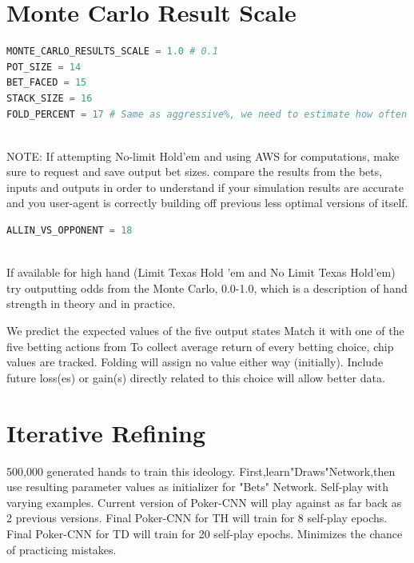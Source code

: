 \documentclass[review]{elsarticle}
\begin{document}
\section{Monte Carlo Result Scale}
\begin{lstlisting}[language=Python, caption=pokerlib.py: 222:226]
MONTE_CARLO_RESULTS_SCALE = 1.0 # 0.1
POT_SIZE = 14
BET_FACED = 15
STACK_SIZE = 16 
FOLD_PERCENT = 17 # Same as aggressive%, we need to estimate how often good training data (CFR) folds in this similar spot?
\end{lstlisting}
~\cite{moscow25} \\
NOTE: If attempting No-limit Hold'em and using AWS for computations, make sure to request and save output bet sizes.
compare the results from the bets, inputs and outputs in order to understand if your simulation results are
accurate and you user-agent is correctly building off previous less optimal versions of itself. \\

\begin{lstlisting}[language=Python, caption=pokerlib.py: 232]
ALLIN_VS_OPPONENT = 18
\end{lstlisting}
~\cite{moscow25} \\
If available for high hand (Limit Texas Hold 'em and No Limit Texas Hold'em) try outputting odds from the 
Monte Carlo, 0.0-1.0, which is a description of hand strength in theory and in practice. 

We predict the expected values of the five output states
Match it with one of the five betting actions from
To collect average return of every betting choice, chip values are tracked.
Folding will assign no value either way (initially).
Include future loss(es) or gain(s) directly related to this choice will allow better data.


\section{Iterative Refining}

500,000 generated hands to train this ideology.
First,learn"Draws"Network,then use resulting parameter values as initializer for "Bets" Network. 
Self-play with varying examples.
Current version of Poker-CNN will play against as far back as 2 previous versions.
Final Poker-CNN for TH will train for 8 self-play epochs. 
Final Poker-CNN for TD will train for 20 self-play epochs.
Minimizes the chance of practicing mistakes.
\end{document}
